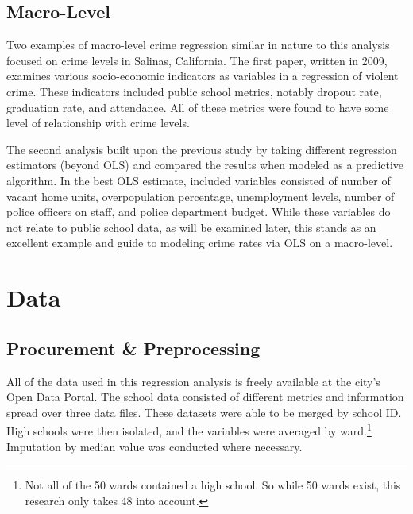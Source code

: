 \documentclass[12pt]{article}
\begin{document}
\subsection{Macro-Level}

Two examples of macro-level crime regression similar in nature to this analysis focused on crime levels in Salinas, California.  The first paper, written in 2009, examines various socio-economic indicators as variables in a regression of violent crime.  These indicators included public school metrics, notably dropout rate, graduation rate, and attendance.  All of these metrics were found to have some level of relationship with crime levels.\cite{salinas_env}

\par

The second analysis built upon the previous study by taking different regression estimators (beyond OLS) and compared the results when modeled as a predictive algorithm.  In the best OLS estimate, included variables consisted of number of vacant home units, overpopulation percentage, unemployment levels, number of police officers on staff, and police department budget.\cite{salinas_crime}  While these variables do not relate to public school data, as will be examined later, this stands as an excellent example and guide to modeling crime rates via OLS on a macro-level.

	\section{Data}


\subsection{Procurement \& Preprocessing}

All of the data used in this regression analysis is freely available at the city's Open Data Portal.\cite{c1data}\cite{c2data}\cite{s1data}\cite{s2data}\cite{s3data}  The school data consisted of different metrics and information spread over three data files.  These datasets were able to be merged by school ID.  High schools were then isolated, and the variables were averaged by ward.\footnote{Not all of the 50 wards contained a high school.  So while 50 wards exist, this research only takes 48 into account.}  Imputation by median value was conducted where necessary.

\par
\end{document}
